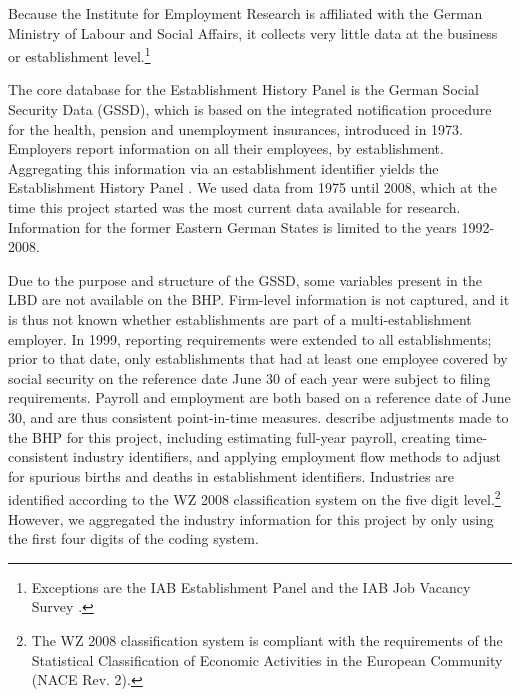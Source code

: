 Because the Institute for Employment Research is affiliated with the German Ministry of Labour and Social Affairs, it collects very little data at the business or establishment level.\footnote{Exceptions are the IAB Establishment Panel \citep{IABEstabPanel} and the IAB Job Vacancy Survey \citep{JVS}.}

The core database for the Establishment History Panel is the German Social Security Data  (GSSD), which is based on the integrated notification procedure for the health, pension and unemployment insurances,   introduced in  1973. Employers report information on all their employees, by establishment. Aggregating this information via an establishment identifier yields the Establishment History Panel \citep[German abbreviation: BHP]{BHP}. We used data from  1975 until 2008, which at the time this project started was the most current data available for research. Information for the former Eastern German States is limited to the years 1992-2008. 

Due to the purpose and structure of the GSSD, some variables present in the \ac{LBD} are not available on the  \ac{BHP}. Firm-level information is not captured, and it is thus not known whether establishments are part of a multi-establishment employer. In 1999, reporting requirements were extended to all establishments; prior to that date, only establishments that  had at least one employee covered by social security on the reference date June 30 of each year were subject to filing requirements. Payroll and employment are both based on a reference date of June 30, and are thus consistent point-in-time measures. 
\citet{SJIAOS-2014b} describe adjustments made to the \ac{BHP} for this project, including estimating full-year payroll, creating time-consistent industry identifiers, and applying employment flow methods \citep{RePEc:iab:iabfme:201006_en} to adjust for spurious births and deaths in establishment identifiers. 
Industries are identified according to the WZ 2008 classification system \citep{WZ2008} on the five digit level.\footnote{The WZ 2008 classification system is compliant with the requirements of the Statistical Classification of Economic Activities in the European Community (NACE Rev. 2).} However, we aggregated the industry information for this project by only using the first four digits of the coding system.




